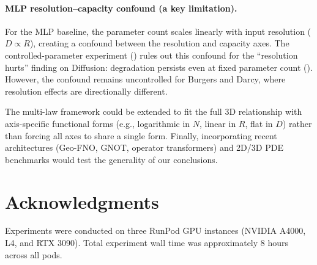 \documentclass[11pt]{article}
\begin{document}
\paragraph{MLP resolution--capacity confound (a key limitation).}
For the MLP baseline, the parameter count scales linearly with input
resolution ($D \propto R$), creating a confound between the
resolution and capacity axes. The controlled-parameter experiment
() rules out this confound for the
``resolution hurts'' finding on Diffusion: degradation persists even
at fixed parameter count (). However,
the confound remains uncontrolled for Burgers and Darcy, where
resolution effects are directionally different.

The multi-law framework could be extended to fit the full 3D
relationship with axis-specific functional forms (e.g., logarithmic
in $N$, linear in $R$, flat in $D$) rather than forcing all axes to
share a single form. Finally, incorporating recent architectures
(Geo-FNO, GNOT, operator transformers) and 2D/3D PDE benchmarks
would test the generality of our conclusions.


\section*{Acknowledgments}
Experiments were conducted on three RunPod GPU instances (NVIDIA A4000,
L4, and RTX 3090). Total experiment wall time was approximately 8 hours
across all pods.
\end{document}
